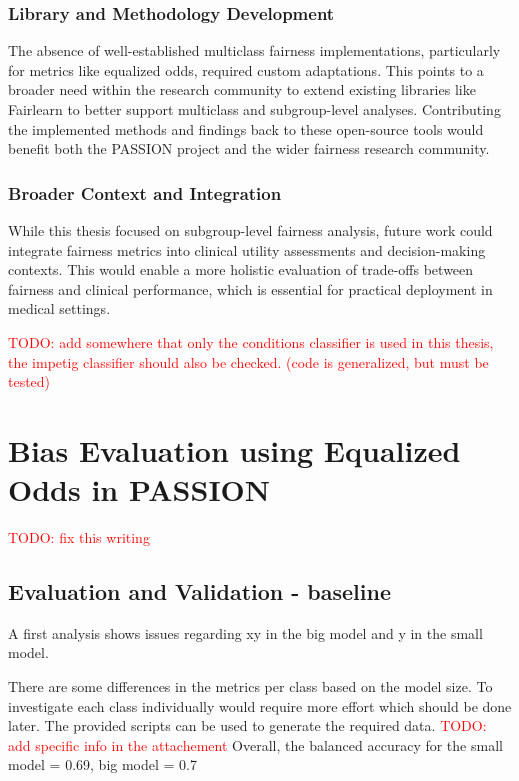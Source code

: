 \documentclass[12pt, a4paper, oneside]{book}   	%
\renewcommand{\todo}[1]{\textcolor{red}{TODO: #1}}
\begin{document}
	\subsection{Library and Methodology Development}
	
	The absence of well-established multiclass fairness implementations, particularly for metrics like equalized odds, required custom adaptations. This points to a broader need within the research community to extend existing libraries like \gls{Fairlearn} to better support multiclass and subgroup-level analyses. Contributing the implemented methods and findings back to these open-source tools would benefit both the PASSION project and the wider fairness research community.
	
	\subsection{Broader Context and Integration}
	
	While this thesis focused on subgroup-level fairness analysis, future work could integrate fairness metrics into clinical utility assessments and decision-making contexts. This would enable a more holistic evaluation of trade-offs between fairness and clinical performance, which is essential for practical deployment in medical settings.
	
	
				
	\todo{add somewhere that only the conditions classifier is used in this thesis, the impetig classifier should also be checked. (code is generalized, but must be tested)}
	
	\chapter{Bias Evaluation using Equalized Odds in PASSION}
		\todo{fix this writing}
			
		\section{Evaluation and Validation - baseline}
			A first analysis shows issues regarding xy in the big model and y in the small model.
			
			There are some differences in the metrics per class based on the model size. To investigate each class individually would require more effort which should be done later. The provided scripts can be used to generate the required data. \todo{add specific info in the attachement}
			Overall, the balanced accuracy for the small model = 0.69, big model = 0.7
			
\end{document}
